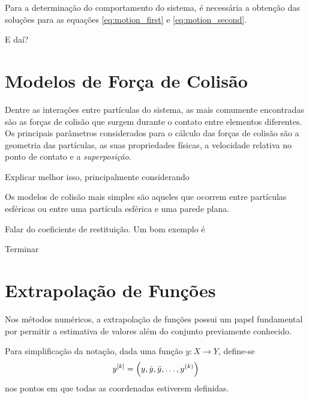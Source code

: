 Para a determinação do comportamento do sistema, é necessária a obtenção das soluções para as equações \eqref{eq:motion_first} e \eqref{eq:motion_second}.

\alert{E daí?}

\section{Modelos de Força de Colisão} \label{sec:collision_force_models}

Dentre as interações entre partículas do sistema, as mais comumente encontradas são as forças de colisão que surgem durante o contato entre elementos diferentes. Os principais parâmetros considerados para o cálculo das forças de colisão são a geometria das partículas, as suas propriedades físicas, a velocidade relativa no ponto de contato e a \textit{superposição}.

\alert{Explicar melhor isso, principalmente considerando }

Os modelos de colisão mais simples são aqueles que ocorrem entre partículas esféricas ou entre uma partícula esférica e uma parede plana.

\alert{Falar do coeficiente de restituição. Um bom exemplo é }


\alert{Terminar}

\section{Extrapolação de Funções}
\label{sec:extrapolation}

Nos métodos numéricos, a extrapolação de funções possui um papel fundamental por permitir a estimativa de valores além do conjunto previamente conhecido.

Para simplificação da notação, dada uma função \(y: X\to Y\), define-se
\[\drvec{\taylorOrder}{y} = \pqty{y, \deriv{1}{y}, \deriv{2}{y}, \dots, \deriv{\taylorOrder}{y}}\]
nos pontos em que todas as coordenadas estiverem definidas.

